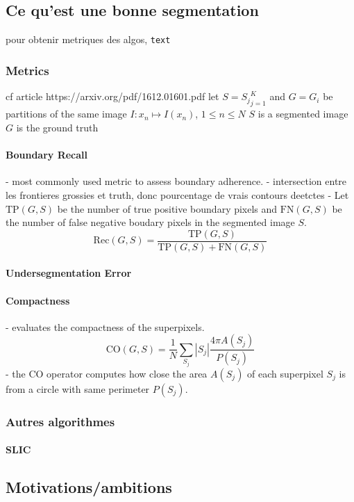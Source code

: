 \documentclass{article}
\begin{document}
    \subsection{Ce qu'est une bonne \spp segmentation}
        pour obtenir metriques des algos, \texttt{text}
        \subsubsection{Metrics}
        cf article https://arxiv.org/pdf/1612.01601.pdf
        let $S = {S_j}^K_{j=1}$ and $G = {G_i}$ be partitions of the same image $I : x_n \mapsto I(x_n)$, $1 \leq n \leq N$
        $S$ is a segmented image
        $G$ is the ground truth
            \paragraph{Boundary Recall}
            - most commonly used metric to assess boundary adherence.
            - intersection entre les frontieres grossies et truth, donc pourcentage de vrais contours deetctes
            - Let $\text{TP}(G,S)$ be the number of true positive boundary pixels and $\text{FN}(G,S)$ be the number of false negative boudary pixels in the segmented image $S$.
            $$\mathrm{Rec}(G,S)=\frac{\mathrm{TP}(G,S)}{\mathrm{TP}(G,S)+\mathrm{FN}(G,S)}$$
            \paragraph{Undersegmentation Error}

            \paragraph{Compactness}
            - evaluates the compactness of the superpixels.
            $$
            \mathrm{CO}(G, S)=\frac{1}{N} \sum_{S_{j}}|S_{j}| \frac{4 \pi A\left(S_{j}\right)}{P\left(S_{j}\right)}
            $$
            - the $\mathrm{CO}$ operator computes how close the area $A(S_j)$ of each superpixel $S_j$ is from a circle with same perimeter $P(S_j)$.
        \subsubsection{Autres algorithmes}
            \paragraph{SLIC}

    \subsection{Motivations/ambitions}
\end{document}
